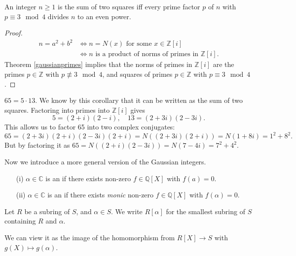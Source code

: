 \documentclass[egregdoesnotlikesansseriftitles,a4paper]{scrartcl}
\begin{document}
\begin{corollary}
       An integer $n \geq 1$ is the sum of two squares iff every prime factor $p$ of $n$ with $p \equiv 3 \mod 4$ divides $n$ to an even power.
       \begin{proof}
              \begin{align*}
                  n=a^2+b^2 & \iff n=N (x) \text{ for some } x \in \mathbb{Z}[i]\\ & \iff n \text{ is a product of norms of primes in } \mathbb{Z}[i].
              \end{align*}
              Theorem \ref{gaussianprimes} implies that the norms of primes in $\mathbb{Z}[i]$ are the primes $p \in \mathbb{Z}$ with $p \not \equiv 3 \mod 4$, and squares of primes $p \in \mathbb{Z}$ with $p\equiv 3 \mod 4$.
       \end{proof}
       \begin{example*}
            $65= 5 \cdot 13$. We know by this corollary that it can be written as the sum of two squares. Factoring into primes into $\mathbb{Z}[i]$ gives \[
                  5=(2+i)(2-i), \quad 13=(2+3i)(2-3i)
            .\] This allows us to factor 65 into two complex conjugates: \[
                  65= (2+3i)(2+i)(2-3i)(2+i)=N \left((2+3i)(2+i)\right)=N (1+8i)=1^2+8^2
            .\] But by factoring it as $65=N \left((2+i)(2-3i)\right)=N (7-4i)=7^2+4^2$.
      \end{example*}
\end{corollary}
Now we introduce a more general version of the Gaussian integers.
\begin{definition*}
       \begin{itemize}
             \item[(i)] $\alpha \in \mathbb{C}$ is an  if there exists non-zero $f \in \mathbb{Q}[X]$ with $f (a)=0$.
             \item[(ii)] $\alpha \in \mathbb{C}$ is an  if there exists \emph{monic} non-zero $f \in \mathbb{Q}[X]$ with $f (\alpha)=0$.
       \end{itemize}
       \begin{notation}
             Let $R $ be a subring of $S$, and $\alpha \in S$. We write $R[\alpha]$ for the smallest subring of $S$ containing $R$ and $\alpha$.

             We can view it as the image of the homomorphism from $R[X] \rightarrow S$ with $g (X)\mapsto g (\alpha)$.
       \end{notation}
\end{definition*}
\end{document}
